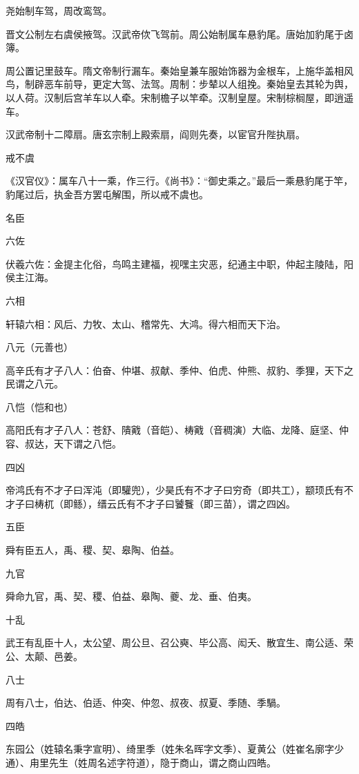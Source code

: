 \documentclass[a4paper,12pt,UTF8,twoside]{ctexbook}
\begin{document}
    尧始制车驾，周改鸾驾。
    
    晋文公制左右虞侯掖驾。汉武帝佽飞驾前。周公始制属车悬豹尾。唐始加豹尾于卤簿。
    
    周公置记里鼓车。隋文帝制行漏车。秦始皇兼车服始饰器为金根车，上施华盖相风鸟，制辟恶车前导，更定大驾、法驾。周制：步辇以人组挽。秦始皇去其轮为舆，以人荷。汉制后宫羊车以人牵。宋制檐子以竿牵。汉制皇屋。宋制棕榈屋，即逍遥车。
    
    汉武帝制十二障扇。唐玄宗制上殿索扇，阎则先奏，以宦官升陛执扇。
    
    戒不虞
    
    《汉官仪》：属车八十一乘，作三行。《尚书》：“御史乘之。”最后一乘悬豹尾于竿，豹尾过后，执金吾方罢屯解围，所以戒不虞也。
    
    名臣
    
    六佐
    
    伏羲六佐：金提主化俗，鸟鸣主建福，视嘿主灾恶，纪通主中职，仲起主陵陆，阳侯主江海。
    
    六相
    
    轩辕六相：风后、力牧、太山、稽常先、大鸿。得六相而天下治。
    
    八元（元善也）
    
    高辛氏有才子八人：伯奋、仲堪、叔献、季仲、伯虎、仲熊、叔豹、季狸，天下之民谓之八元。
    
    八恺（恺和也）
    
    高阳氏有才子八人：苍舒、隤戭（音皑）、梼戭（音稠演）大临、龙降、庭坚、仲容、叔达，天下谓之八恺。
    
    四凶
    
    帝鸿氏有不才子曰浑沌（即驩兜），少昊氏有不才子曰穷奇（即共工），颛顼氏有不才子曰梼杌（即鲧），缙云氏有不才子曰饕餮（即三苗），谓之四凶。
    
    五臣
    
    舜有臣五人，禹、稷、契、皋陶、伯益。
    
    九官
    
    舜命九官，禹、契、稷、伯益、皋陶、夔、龙、垂、伯夷。
    
    十乱
    
    武王有乱臣十人，太公望、周公旦、召公奭、毕公高、闳夭、散宜生、南公适、荣公、太颠、邑姜。
    
    八士
    
    周有八士，伯达、伯适、仲突、仲忽、叔夜、叔夏、季随、季騧。
    
    四皓
    
    东园公（姓辕名秉字宣明）、绮里季（姓朱名晖字文季）、夏黄公（姓崔名廓字少通）、甪里先生（姓周名述字符道），隐于商山，谓之商山四皓。
    
\end{document}
